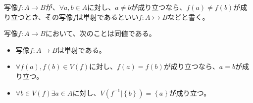\documentclass[dvipdfmx]{jsarticle}
\begin{document}
\begin{dfn}
写像$f:A \rightarrow B$が、$\forall a,b \in A$に対し、$a \neq b$が成り立つなら、$f(a) \neq f(b)$が成り立つとき、その写像$f$は単射であるといい$f:A \rightarrowtail B$などと書く。
\end{dfn}
\begin{thm}
\label{1.2.3.8}
写像$f:A \rightarrow B$において、次のことは同値である。
\begin{itemize}
\item
  写像$f:A \rightarrow B$は単射である。
\item
  $\forall f(a),f(b) \in V(f)$に対し、$f(a) = f(b)$が成り立つなら、$a = b$が成り立つ。
\item
  $\forall b \in V(f)\exists a \in A$に対し、$V\left( f^{- 1}|\left\{ b \right\} \right) = \left\{ a \right\}$が成り立つ。
\end{itemize}
\end{thm}
\end{document}
